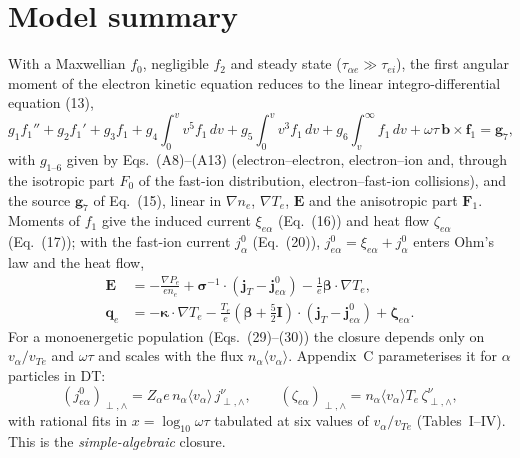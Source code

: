 \documentclass[11pt,a4paper]{article}
\newcommand{\ot}{\omega\tau}
\begin{document}
\section{Model summary}\label{sec:model}
With a Maxwellian $f_0$, negligible $f_2$ and steady state ($\tau_{\alpha e}\gg\tau_{ei}$), the first angular moment of
the electron kinetic equation reduces to the linear integro-differential equation (13),
\begin{equation}
   g_1 f_1'' + g_2 f_1' + g_3 f_1 + g_4\!\int_0^v\! v^5 f_1\,dv + g_5\!\int_0^v\! v^3 f_1\,dv
   + g_6\!\int_v^\infty\! f_1\,dv + \ot\,\mathbf b\times\mathbf f_1 = \mathbf g_7 ,
   \label{eq:f1}
\end{equation}
with $g_{1\text{--}6}$ given by Eqs.~(A8)--(A13) (electron--electron, electron--ion and, through the isotropic part $F_0$
of the fast-ion distribution, electron--fast-ion collisions), and the source $\mathbf g_7$ of Eq.~(15), linear in
$\nabla n_e$, $\nabla T_e$, $\mathbf E$ and the anisotropic part $\mathbf F_1$. Moments of $f_1$ give the induced current
$\xi_{e\alpha}$ (Eq.~(16)) and heat flow $\zeta_{e\alpha}$ (Eq.~(17)); with the fast-ion current $j^0_\alpha$ (Eq.~(20)),
$j^0_{e\alpha}=\xi_{e\alpha}+j^0_\alpha$ enters Ohm's law and the heat flow,
\begin{align}
   \mathbf E &= -\frac{\nabla P_e}{en_e} + \boldsymbol\sigma^{-1}\!\cdot(\mathbf j_T-\mathbf j^0_{e\alpha})
                - \frac1e\boldsymbol\beta\cdot\nabla T_e , \tag{23}\\
   \mathbf q_e &= -\boldsymbol\kappa\cdot\nabla T_e - \frac{T_e}{e}\left(\boldsymbol\beta+\tfrac52\mathbf I\right)\cdot
                (\mathbf j_T-\mathbf j^0_{e\alpha}) + \boldsymbol\zeta_{e\alpha} . \tag{24}
\end{align}
For a monoenergetic population (Eqs.~(29)--(30)) the closure depends only on $v_\alpha/v_{Te}$ and $\ot$ and scales with
the flux $n_\alpha\langle v_\alpha\rangle$. Appendix~C parameterises it for $\alpha$ particles in DT:
\begin{equation}
   (j^0_{e\alpha})_{\perp,\wedge} = Z_\alpha e\,n_\alpha\langle v_\alpha\rangle\, j^\nu_{\perp,\wedge}, \qquad
   (\zeta_{e\alpha})_{\perp,\wedge} = n_\alpha\langle v_\alpha\rangle T_e\, \zeta^\nu_{\perp,\wedge},
   \label{eq:closure}
\end{equation}
with rational fits in $x=\log_{10}\ot$ tabulated at six values of $v_\alpha/v_{Te}$ (Tables~I--IV). This is the
\emph{simple-algebraic} closure.

\end{document}
